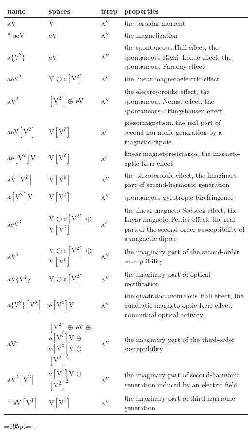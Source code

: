 \documentclass[10pt,a4paper]{article}
\newcommand{\needspace}[1]{\par\penalty-100\begingroup\dimen0=#1\relax\dimen2=\pagegoal
  \advance\dimen2-\pagetotal\ifdim\dimen0>\dimen2\relax\ifdim\dimen2>0pt\vfil\break\fi\fi
  \endgroup}
\numberwithin{equation}{section}
\newcommand{\irr}[1]{\text{\normalfont\scshape #1}}
\newcommand{\jahn}[1]{\mathrm{#1}}
\newlength{\fillwidth}\newlength{\cellwidth}\newlength{\colwidth}
\begin{document}
{\begin{longtable}{@{}lll>{\RaggedRight\arraybackslash}p{\fillwidth}@{}}
name & spaces & irrep & properties\\\midrule\endhead
\bottomrule\endfoot\endlastfoot
$\jahn{aV}$ & $\jahn{V}$ & $\irr{a}''$ & the toroidal moment\\*
$\jahn{aeV}$ & $\jahn{eV}$ & $\irr{a}''$ & the magnetization\\
$\jahn{a\{V^{2}\}}$ & $\jahn{eV}$ & $\irr{a}''$ & the spontaneous Hall effect, the spontaneous Righi–Leduc effect, the spontaneous Faraday effect\\
$\jahn{aeV^{2}}$ & $\jahn{V}$ $\oplus$ $\jahn{e[V^{2}]}$ & $\irr{a}''$ & the linear magnetoelectric effect\\
$\jahn{aV^{2}}$ & $\jahn{[V^{2}]}$ $\oplus$ $\jahn{eV}$ & $\irr{a}''$ & the electrotoroidic effect, the spontaneous Nernst effect, the spontaneous Ettingshausen effect\\
$\jahn{aeV[V^{2}]}$ & $\jahn{V[V^{2}]}$ & $\irr{a}'$ & piezomagnetism, the real part of second-harmonic generation by a magnetic dipole\\
$\jahn{ae[V^{2}]V}$ & $\jahn{V[V^{2}]}$ & $\irr{a}'$ & linear magnetoresistance, the magneto-optic Kerr effect\\
$\jahn{aV[V^{2}]}$ & $\jahn{V[V^{2}]}$ & $\irr{a}''$ & the piezotoroidic effect, the imaginary part of second-harmonic generation\\
$\jahn{a[V^{2}]V}$ & $\jahn{V[V^{2}]}$ & $\irr{a}''$ & spontaneous gyrotropic birefringence\\
$\jahn{aeV^{3}}$ & $\jahn{V}$ $\oplus$ $\jahn{e[V^{2}]}$ $\oplus$ $\jahn{V[V^{2}]}$ & $\irr{a}'$ & the linear magneto-Seebeck effect, the linear magneto-Peltier effect, the real part of the second-order susceptibility of a magnetic dipole\\
$\jahn{aV^{3}}$ & $\jahn{V}$ $\oplus$ $\jahn{e[V^{2}]}$ $\oplus$ $\jahn{V[V^{2}]}$ & $\irr{a}''$ & the imaginary part of the second-order susceptibility\\
$\jahn{aV\{V^{2}\}}$ & $\jahn{V}$ $\oplus$ $\jahn{e[V^{2}]}$ & $\irr{a}''$ & the imaginary part of optical rectification\\
$\jahn{a\{V^{2}\}[V^{2}]}$ & $\jahn{e[V^{2}]V}$ & $\irr{a}''$ & the quadratic anomalous Hall effect, the quadratic magneto-optic Kerr effect, nonmutual optical activity\\
$\jahn{aV^{4}}$ & $\jahn{[V^{2}]}$ $\oplus$ $\jahn{eV}$ $\oplus$ $\jahn{e[V^{2}]V}$ $\oplus$ $\jahn{e[V^{2}]V}$ $\oplus$ $\jahn{[V^{2}]^{2}}$ & $\irr{a}''$ & the imaginary part of the third-order susceptibility\\
$\jahn{aV^{2}[V^{2}]}$ & $\jahn{e[V^{2}]V}$ $\oplus$ $\jahn{[V^{2}]^{2}}$ & $\irr{a}''$ & the imaginary part of second-harmonic generation induced by an electric field\\*
$\jahn{aV[V^{3}]}$ & $\jahn{V[V^{3}]}$ & $\irr{a}''$ & the imaginary part of third-harmonic generation\\
\bottomrule\end{longtable}}
\needspace{195pt}
\end{document}
